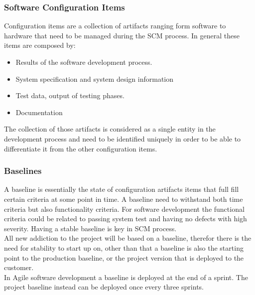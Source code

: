 \documentclass[../main.tex]{subfiles}
\begin{document}
\subsubsection{Software Configuration Items}
Configuration items are a collection of artifacts ranging form software to hardware that need to be managed during the SCM process. In general these items are composed by:
\begin{itemize}
    \item Results of the software development process. 
    \item System specification and system design information
    \item Test data, output of testing phases. 
    \item Documentation
\end{itemize}
The collection of those artifacts is considered as a single entity in the development process and need to be identified uniquely in order to be able to differentiate it from the other configuration items. 
\subsubsection{Baselines}
A baseline is essentially the state of configuration artifacts items that full fill certain criteria at some point in time. A baseline need to withstand both time criteria but also functionality criteria. For software development the functional criteria could be related to passing system test and having no defects with high severity. Having a stable baseline is key in SCM process.\\
All new addiction to the project will be based on a baseline, therefor there is the need for stability to start up on, other than that a baseline is also the starting point to the production baseline, or the project version that is deployed to the customer.\\
In Agile software development a baseline is deployed at the end of a sprint. The project baseline instead can be deployed once every three sprints. 
\end{document}
